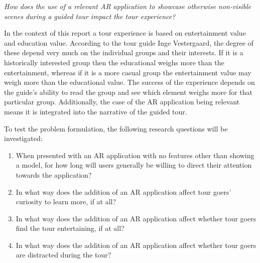 \begin{displayquote}\textit{How does the use of a relevant AR application to showcase otherwise non-visible scenes during a guided tour impact the tour experience?}\end{displayquote}

In the context of this report a tour experience is based on entertainment value and education value. According to the tour guide Inge Vestergaard, the degree of these depend very much on the individual groups and their interests. If it is a historically interested group then the educational weighs more than the entertainment, whereas if it is a more casual group the entertainment value may weigh more than the educational value. The success of the experience depends on the guide’s ability to read the group and see which element weighs more for that particular group. Additionally, the case of the AR application being relevant means it is integrated into the narrative of the guided tour.

To test the problem formulation, the following research questions will be investigated: 

\begin{enumerate}
\item When presented with an AR application with no features other than showing a model, for how long will users generally be willing to direct their attention towards the application?
\item In what way does the addition of an AR application affect tour goers’ curiosity to learn more, if at all?
\item In what way does the addition of an AR application affect whether tour goers find the tour entertaining, if at all?
\item In what way does the addition of an AR application affect whether tour goers are distracted during the tour?
\end{enumerate}

